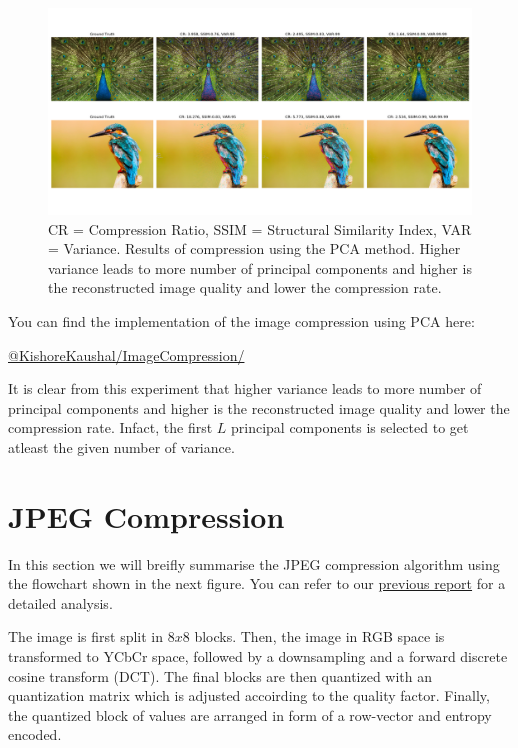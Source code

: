 \begin{figure}[!ht]
    \label{fig:imageCompressionUsingPCA}
    \centering
    \includegraphics[width=1\textwidth]{../fig/midsemwork/ImageCompressionWithPCA.png}
    \caption{CR = Compression Ratio, SSIM = Structural Similarity Index, VAR = Variance. Results of compression using the PCA method. Higher variance leads to more number of principal components and higher is the reconstructed image quality and lower the compression rate.}
    
\end{figure}

You can find the implementation of the image compression using PCA here:

\href{https://github.com/KishoreKaushal/ImageCompression/tree/master/PCA}{@KishoreKaushal/ImageCompression/}

It is clear from this experiment that higher variance leads to more number of principal components and higher is the reconstructed image quality and lower the compression rate. Infact, the first $L$ principal components is selected to get atleast the given number of variance.

\section{JPEG Compression}

In this section we will breifly summarise the JPEG compression algorithm using the flowchart shown in the next figure.
You can refer to our \href{https://github.com/KishoreKaushal/btp-report-phase2/blob/master/btp_report.pdf}{previous report} for a detailed analysis.

The image is first split in $8x8$ blocks. 
Then, the image in RGB space is transformed to YCbCr space, followed by a downsampling and a forward discrete cosine transform (DCT). 
The final blocks are then quantized with an quantization matrix which is adjusted accoirding to the quality factor. 
Finally, the quantized block of values are arranged in form of a row-vector and entropy encoded.


